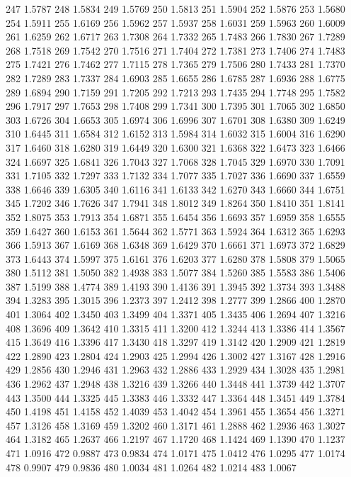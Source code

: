 247 1.5787
248 1.5834
249 1.5769
250 1.5813
251 1.5904
252 1.5876
253 1.5680
254 1.5911
255 1.6169
256 1.5962
257 1.5937
258 1.6031
259 1.5963
260 1.6009
261 1.6259
262 1.6717
263 1.7308
264 1.7332
265 1.7483
266 1.7830
267 1.7289
268 1.7518
269 1.7542
270 1.7516
271 1.7404
272 1.7381
273 1.7406
274 1.7483
275 1.7421
276 1.7462
277 1.7115
278 1.7365
279 1.7506
280 1.7433
281 1.7370
282 1.7289
283 1.7337
284 1.6903
285 1.6655
286 1.6785
287 1.6936
288 1.6775
289 1.6894
290 1.7159
291 1.7205
292 1.7213
293 1.7435
294 1.7748
295 1.7582
296 1.7917
297 1.7653
298 1.7408
299 1.7341
300 1.7395
301 1.7065
302 1.6850
303 1.6726
304 1.6653
305 1.6974
306 1.6996
307 1.6701
308 1.6380
309 1.6249
310 1.6445
311 1.6584
312 1.6152
313 1.5984
314 1.6032
315 1.6004
316 1.6290
317 1.6460
318 1.6280
319 1.6449
320 1.6300
321 1.6368
322 1.6473
323 1.6466
324 1.6697
325 1.6841
326 1.7043
327 1.7068
328 1.7045
329 1.6970
330 1.7091
331 1.7105
332 1.7297
333 1.7132
334 1.7077
335 1.7027
336 1.6690
337 1.6559
338 1.6646
339 1.6305
340 1.6116
341 1.6133
342 1.6270
343 1.6660
344 1.6751
345 1.7202
346 1.7626
347 1.7941
348 1.8012
349 1.8264
350 1.8410
351 1.8141
352 1.8075
353 1.7913
354 1.6871
355 1.6454
356 1.6693
357 1.6959
358 1.6555
359 1.6427
360 1.6153
361 1.5644
362 1.5771
363 1.5924
364 1.6312
365 1.6293
366 1.5913
367 1.6169
368 1.6348
369 1.6429
370 1.6661
371 1.6973
372 1.6829
373 1.6443
374 1.5997
375 1.6161
376 1.6203
377 1.6280
378 1.5808
379 1.5065
380 1.5112
381 1.5050
382 1.4938
383 1.5077
384 1.5260
385 1.5583
386 1.5406
387 1.5199
388 1.4774
389 1.4193
390 1.4136
391 1.3945
392 1.3734
393 1.3488
394 1.3283
395 1.3015
396 1.2373
397 1.2412
398 1.2777
399 1.2866
400 1.2870
401 1.3064
402 1.3450
403 1.3499
404 1.3371
405 1.3435
406 1.2694
407 1.3216
408 1.3696
409 1.3642
410 1.3315
411 1.3200
412 1.3244
413 1.3386
414 1.3567
415 1.3649
416 1.3396
417 1.3430
418 1.3297
419 1.3142
420 1.2909
421 1.2819
422 1.2890
423 1.2804
424 1.2903
425 1.2994
426 1.3002
427 1.3167
428 1.2916
429 1.2856
430 1.2946
431 1.2963
432 1.2886
433 1.2929
434 1.3028
435 1.2981
436 1.2962
437 1.2948
438 1.3216
439 1.3266
440 1.3448
441 1.3739
442 1.3707
443 1.3500
444 1.3325
445 1.3383
446 1.3332
447 1.3364
448 1.3451
449 1.3784
450 1.4198
451 1.4158
452 1.4039
453 1.4042
454 1.3961
455 1.3654
456 1.3271
457 1.3126
458 1.3169
459 1.3202
460 1.3171
461 1.2888
462 1.2936
463 1.3027
464 1.3182
465 1.2637
466 1.2197
467 1.1720
468 1.1424
469 1.1390
470 1.1237
471 1.0916
472 0.9887
473 0.9834
474 1.0171
475 1.0412
476 1.0295
477 1.0174
478 0.9907
479 0.9836
480 1.0034
481 1.0264
482 1.0214
483 1.0067
